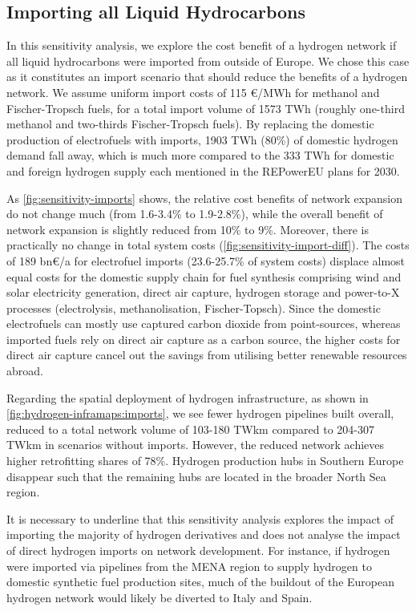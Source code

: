 \subsection{Importing all Liquid Hydrocarbons}
\label{sec:si:sensitivity-imports}

In this sensitivity analysis, we explore the cost benefit of a hydrogen network
if all liquid hydrocarbons were imported from outside of Europe. We chose this
case as it constitutes an import scenario that should reduce the
benefits of a hydrogen network. We assume uniform import costs of 115
\euro/MWh for
methanol and Fischer-Tropsch fuels, for a total import volume of 1573 TWh
(roughly one-third methanol and two-thirds Fischer-Tropsch fuels). By replacing the
domestic production of electrofuels with imports, 1903 TWh (80\%) of domestic
hydrogen demand fall away, which is much more compared to the 333 TWh for
domestic and foreign hydrogen supply each mentioned in the REPowerEU plans for
2030.

As \cref{fig:sensitivity-imports} shows, the relative cost benefits of network
expansion do not change much (from 1.6-3.4\% to 1.9-2.8\%), while the overall
benefit of network expansion is slightly reduced from 10\% to 9\%. Moreover,
there is practically no change in total system costs
(\cref{fig:sensitivity-import-diff}). The costs of 189 bn\euro/a for electrofuel
imports (23.6-25.7\% of system costs) displace almost equal costs for the
domestic supply chain for fuel synthesis comprising wind and solar electricity
generation, direct air capture, hydrogen storage and power-to-X processes
(electrolysis, methanolisation, Fischer-Topsch). Since the domestic electrofuels
can mostly use captured carbon dioxide from point-sources, whereas imported
fuels rely on direct air capture as a carbon source, the higher costs for direct
air capture cancel out the savings from utilising better renewable resources
abroad.

Regarding the spatial deployment of hydrogen infrastructure, as shown in
\cref{fig:hydrogen-inframaps:imports}, we see fewer hydrogen pipelines built
overall, reduced to a total network volume of 103-180 TWkm compared to 204-307
TWkm in scenarios without imports. However, the reduced network achieves higher
retrofitting shares of 78\%. Hydrogen production hubs in Southern Europe
disappear such that the remaining hubs are located in the broader North Sea region.

It is necessary to underline that this sensitivity analysis explores the impact
of importing the majority of hydrogen derivatives and does not analyse the
impact of direct hydrogen imports on network development. For instance, if
hydrogen were imported via pipelines from the MENA region to supply hydrogen to
domestic synthetic fuel production sites, much of the buildout of the European
hydrogen network would likely be diverted to Italy and Spain.

